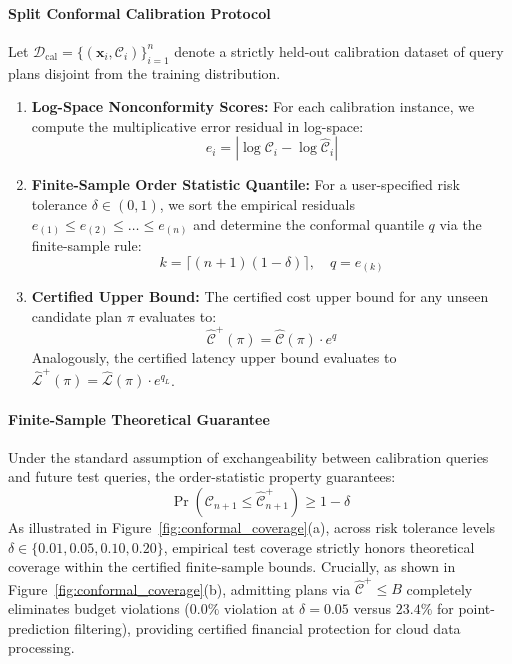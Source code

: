 \paragraph{Split Conformal Calibration Protocol}
Let $\mathcal{D}_{\text{cal}} = \{(\mathbf{x}_i, \mathcal{C}_i)\}_{i=1}^n$ denote a strictly held-out calibration dataset of query plans disjoint from the training distribution.
\begin{enumerate}
    \item \textbf{Log-Space Nonconformity Scores:} For each calibration instance, we compute the multiplicative error residual in log-space:
    \begin{equation}
    e_i = |\log \mathcal{C}_i - \log \hat{\mathcal{C}}_i|
    \end{equation}
    \item \textbf{Finite-Sample Order Statistic Quantile:} For a user-specified risk tolerance $\delta \in (0, 1)$, we sort the empirical residuals $e_{(1)} \le e_{(2)} \le \dots \le e_{(n)}$ and determine the conformal quantile $q$ via the finite-sample rule:
    \begin{equation}
    k = \lceil (n + 1)(1 - \delta) \rceil, \quad q = e_{(k)}
    \end{equation}
    \item \textbf{Certified Upper Bound:} The certified cost upper bound for any unseen candidate plan $\pi$ evaluates to:
    \begin{equation}
    \hat{\mathcal{C}}^+(\pi) = \hat{\mathcal{C}}(\pi) \cdot e^q
    \end{equation}
    Analogously, the certified latency upper bound evaluates to $\hat{\mathcal{L}}^+(\pi) = \hat{\mathcal{L}}(\pi) \cdot e^{q_L}$.
\end{enumerate}

\paragraph{Finite-Sample Theoretical Guarantee}
Under the standard assumption of exchangeability between calibration queries and future test queries, the order-statistic property guarantees:
\begin{equation}
\Pr\left(\mathcal{C}_{n+1} \le \hat{\mathcal{C}}^+_{n+1}\right) \ge 1 - \delta
\end{equation}
As illustrated in Figure~\ref{fig:conformal_coverage}(a), across risk tolerance levels $\delta \in \{0.01, 0.05, 0.10, 0.20\}$, empirical test coverage strictly honors theoretical coverage within the certified finite-sample bounds. Crucially, as shown in Figure~\ref{fig:conformal_coverage}(b), admitting plans via $\hat{\mathcal{C}}^+ \le B$ completely eliminates budget violations ($0.0\%$ violation at $\delta = 0.05$ versus $23.4\%$ for point-prediction filtering), providing certified financial protection for cloud data processing.

